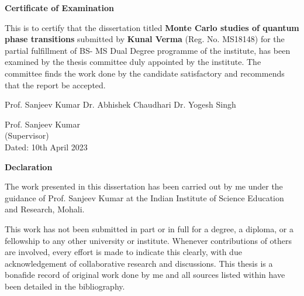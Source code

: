 \documentclass[a4paper,12pt]{report}
\numberwithin{equation}{section}
\begin{document}


\begin{center}
    \textbf{\Large Certificate of Examination}
\end{center}

This is to certify that the dissertation titled \textbf{Monte Carlo studies of quantum phase transitions} submitted by \textbf{Kunal Verma} (Reg. No. MS18148) for the partial fulfillment of BS- MS Dual Degree programme of the institute, has been examined by the thesis committee duly appointed by the institute. The committee finds the work done by the candidate satisfactory and recommends that the report be accepted.

\vspace{4cm}

Prof. Sanjeev Kumar \hspace{1.5cm} Dr. Abhishek Chaudhari \hspace{1.5cm}  Dr. Yogesh Singh

\vspace{4cm}

\begin{flushright}
    Prof. Sanjeev Kumar
    \\
    (Supervisor)
    \\
    \vspace{4cm}
    Dated: 10th April 2023
\end{flushright}

\cleardoublepage

\begin{center}
    \textbf{\Large Declaration}
\end{center}
The work presented in this dissertation has been carried out by me under the guidance of Prof. Sanjeev Kumar at the Indian Institute of Science Education and Research, Mohali.

\vspace{0.4cm}

This work has not been submitted in part or in full for a degree, a diploma, or a fellowship to any other university or institute. Whenever contributions of others are involved, every effort is made to indicate this clearly, with due acknowledgement of collaborative research and discussions. This thesis is a bonafide record of original work done by me and all sources listed within have been detailed in the bibliography.

\vspace{2cm}
\end{document}
